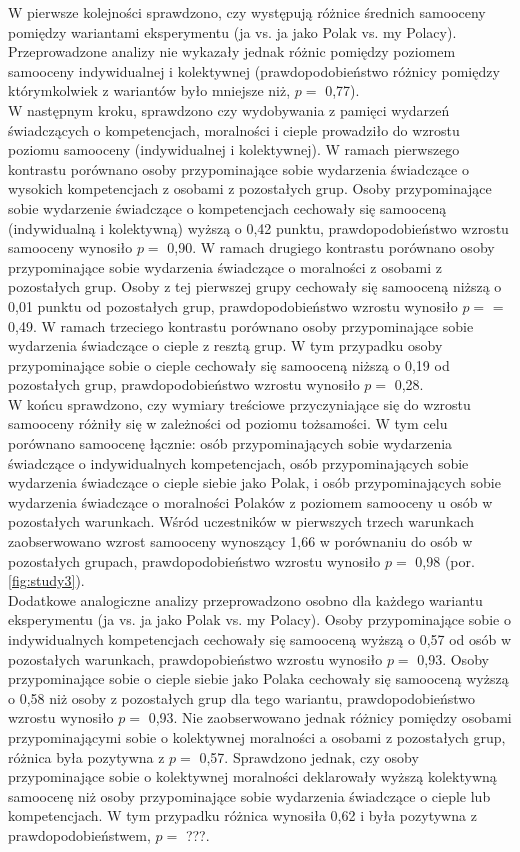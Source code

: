 \documentclass[man]{apa6}
\begin{document}
W pierwsze kolejności sprawdzono, czy występują różnice średnich samooceny pomiędzy wariantami eksperymentu (ja vs. ja jako Polak vs. my Polacy). Przeprowadzone analizy nie wykazały jednak różnic pomiędzy poziomem samooceny indywidualnej i kolektywnej (prawdopodobieństwo różnicy pomiędzy którymkolwiek z wariantów było mniejsze niż, $p =$ 0,77). \\

W następnym kroku, sprawdzono czy wydobywania z pamięci wydarzeń świadczących o kompetencjach, moralności i cieple prowadziło do wzrostu poziomu samooceny (indywidualnej i kolektywnej). W ramach pierwszego kontrastu porównano osoby przypominające sobie wydarzenia świadczące o wysokich kompetencjach z osobami z pozostałych grup. Osoby przypominające sobie wydarzenie świadczące o kompetencjach cechowały się samooceną (indywidualną i kolektywną) wyższą o 0,42 punktu, prawdopodobieństwo wzrostu samooceny wynosiło $p =$ 0,90. W ramach drugiego kontrastu porównano osoby przypominające sobie wydarzenia świadczące o moralności z osobami z pozostałych grup. Osoby z tej pierwszej grupy cechowały się samooceną niższą o 0,01 punktu od pozostałych grup, prawdopodobieństwo wzrostu wynosiło $p =$ = 0,49. W ramach trzeciego kontrastu porównano osoby przypominające sobie wydarzenia świadczące o cieple z resztą grup. W tym przypadku osoby przypominające sobie o cieple cechowały się samooceną niższą o 0,19 od pozostałych grup, prawdopodobieństwo wzrostu wynosiło $p =$ 0,28. \\

W końcu sprawdzono, czy wymiary treściowe przyczyniające się do wzrostu samooceny różniły się w zależności od poziomu tożsamości. W tym celu porównano samoocenę łącznie: osób przypominających sobie wydarzenia świadczące o indywidualnych kompetencjach, osób przypominających sobie wydarzenia świadczące o cieple siebie jako Polak, i osób przypominających sobie wydarzenia świadczące o moralności Polaków z poziomem samooceny u osób w pozostałych warunkach. Wśród uczestników w pierwszych trzech warunkach zaobserwowano wzrost samooceny wynoszący 1,66 w porównaniu do osób w pozostałych grupach, prawdopodobieństwo wzrostu wynosiło $p =$ 0,98 (por. \ref{fig:study3}).\\

Dodatkowe analogiczne analizy przeprowadzono osobno dla każdego wariantu eksperymentu (ja vs. ja jako Polak vs. my Polacy). Osoby przypominające sobie o indywidualnych kompetencjach cechowały się samooceną wyższą o 0,57 od osób w pozostałych warunkach, prawdopobieństwo wzrostu wynosiło $p =$ 0,93. Osoby przypominające sobie o cieple siebie jako Polaka cechowały się samooceną wyższą o 0,58 niż osoby z pozostałych grup dla tego wariantu, prawdopodobieństwo wzrostu wynosiło $p =$ 0,93. Nie zaobserwowano jednak różnicy pomiędzy osobami przypominającymi sobie o kolektywnej moralności a osobami z pozostałych grup, różnica była pozytywna z $p =$ 0,57. Sprawdzono jednak, czy osoby przypominające sobie o kolektywnej moralności deklarowały wyższą kolektywną samoocenę niż osoby przypominające sobie wydarzenia świadczące o cieple lub kompetencjach. W tym przypadku różnica wynosiła 0,62 i była pozytywna z prawdopodobieństwem, $p =$ ???.
\end{document}
